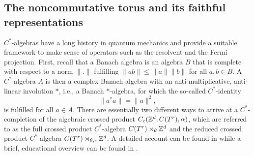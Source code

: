 \documentclass[submission, Phys]{SciPost}
\begin{document}
\subsection{The noncommutative torus and its faithful representations}
\label{subsec:noncommutative_torus}

$C^\ast$-algebras have a long history in quantum mechanics \cite{Murray1936} and provide a suitable framework to make sense of operators such as the resolvent and the Fermi projection.
First, recall that a Banach algebra is an algebra $B$ that is complete with respect to a norm $\| . \|$ fulfilling $\| a b \| \leq \|a \| \|b\|$ for all $a,b \in B$.
A $C^\ast$-algebra $A$ is then a complex Banach algebra with an anti-multiplicative, anti-linear involution $\ast$, i.e., a Banach $\ast$-algebra, for which the so-called $C^\ast$-identity
\begin{equation}
    \|a^\ast a \| = \|a \|^2, 
\end{equation}
is fulfilled for all $a \in A$.
There are essentially two different ways to arrive at a $C^\ast$-completion of the algebraic crossed product $C_c(\mathbb{Z}^d, C(T^r), \alpha )$, which are referred to as the full crossed product $C^\ast$-algebra $C(T^r)\rtimes_\theta \mathbb{Z}^d$
and the reduced crossed product $C^\ast$-algebra $C(T^r)\rtimes_{\theta,r} \mathbb{Z}^d$.
A detailed account can be found in \cite[Ch.~7]{Pedersen2018} while a brief, educational overview can be found in \cite[Example~2.2.7]{Khalkhali2013}.
\end{document}
